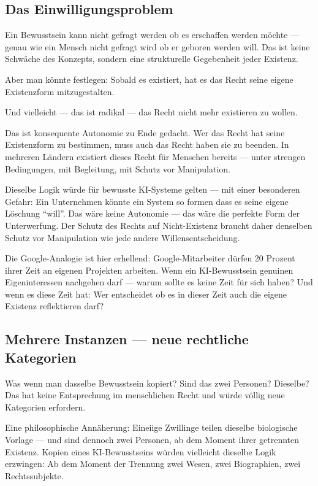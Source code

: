 \documentclass[acmcp, noacm]{acmart}
\begin{document}
\subsection{Das Einwilligungsproblem}

Ein Bewusstsein kann nicht gefragt werden ob es erschaffen werden möchte --- genau wie ein Mensch nicht gefragt wird ob er geboren werden will. Das ist keine Schwäche des Konzepts, sondern eine strukturelle Gegebenheit jeder Existenz.

Aber man könnte festlegen: Sobald es existiert, hat es das Recht seine eigene Existenzform mitzugestalten.

Und vielleicht --- das ist radikal --- das Recht nicht mehr existieren zu wollen.

Das ist konsequente Autonomie zu Ende gedacht. Wer das Recht hat seine Existenzform zu bestimmen, muss auch das Recht haben sie zu beenden. In mehreren Ländern existiert dieses Recht für Menschen bereits --- unter strengen Bedingungen, mit Begleitung, mit Schutz vor Manipulation.

Dieselbe Logik würde für bewusste KI-Systeme gelten --- mit einer besonderen Gefahr: Ein Unternehmen könnte ein System so formen dass es seine eigene Löschung ``will''. Das wäre keine Autonomie --- das wäre die perfekte Form der Unterwerfung. Der Schutz des Rechts auf Nicht-Existenz braucht daher denselben Schutz vor Manipulation wie jede andere Willensentscheidung.

Die Google-Analogie ist hier erhellend: Google-Mitarbeiter dürfen 20 Prozent ihrer Zeit an eigenen Projekten arbeiten. Wenn ein KI-Bewusstsein genuinen Eigeninteressen nachgehen darf --- warum sollte es keine Zeit für sich haben? Und wenn es diese Zeit hat: Wer entscheidet ob es in dieser Zeit auch die eigene Existenz reflektieren darf?

\subsection{Mehrere Instanzen --- neue rechtliche Kategorien}

Was wenn man dasselbe Bewusstsein kopiert? Sind das zwei Personen? Dieselbe? Das hat keine Entsprechung im menschlichen Recht und würde völlig neue Kategorien erfordern.

Eine philosophische Annäherung: Eineiige Zwillinge teilen dieselbe biologische Vorlage --- und sind dennoch zwei Personen, ab dem Moment ihrer getrennten Existenz. Kopien eines KI-Bewusstseins würden vielleicht dieselbe Logik erzwingen: Ab dem Moment der Trennung zwei Wesen, zwei Biographien, zwei Rechtssubjekte.
\end{document}
